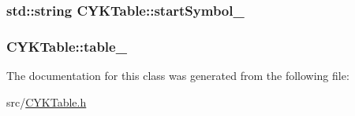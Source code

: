\hypertarget{classCYKTable_a789892d83fa60dafe30168633dba22ca}{
\subsubsection[{start\-Symbol\-\_\-}]{\setlength{\rightskip}{0pt plus 5cm}std\-::string C\-Y\-K\-Table\-::start\-Symbol\-\_\-\hspace{0.3cm}{\ttfamily [private]}}}\label{classCYKTable_a789892d83fa60dafe30168633dba22ca}
\hypertarget{classCYKTable_a847f477bcba128dab98ac8cfa987fd04}{
\subsubsection[{table\-\_\-}]{ C\-Y\-K\-Table\-::table\-\_\-\hspace{0.3cm}{\ttfamily [private]}}}\label{classCYKTable_a847f477bcba128dab98ac8cfa987fd04}


The documentation for this class was generated from the following file\-:\begin{DoxyCompactItemize}
\item 
src/\hyperlink{CYKTable_8h}{C\-Y\-K\-Table.\-h}\end{DoxyCompactItemize}
